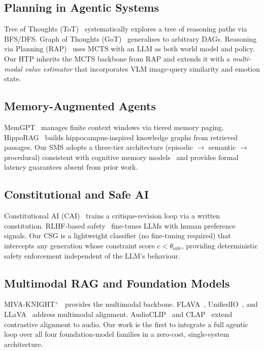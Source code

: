 \documentclass[10pt,conference]{IEEEtran}
\theoremstyle{ieeethm}
\theoremstyle{ieeedef}
\theoremstyle{ieeeremark}
\begin{document}
\subsection{Planning in Agentic Systems}

Tree of Thoughts (ToT)~\cite{yao2023tot} systematically explores a tree of reasoning paths via BFS/DFS. Graph of Thoughts (GoT)~\cite{besta2023got} generalises to arbitrary DAGs. Reasoning via Planning (RAP)~\cite{hao2023rap} uses MCTS with an LLM as both world model and policy. Our HTP inherits the MCTS backbone from RAP and extends it with a \emph{multi-modal value estimator} that incorporates VLM image-query similarity and emotion state.

\subsection{Memory-Augmented Agents}

MemGPT~\cite{packer2023memgpt} manages finite context windows via tiered memory paging. HippoRAG~\cite{gutierrez2024hipporag} builds hippocampus-inspired knowledge graphs from retrieved passages. Our SMS adopts a three-tier architecture (episodic $\to$ semantic $\to$ procedural) consistent with cognitive memory models~\cite{atkinson1968human} and provides formal latency guarantees absent from prior work.

\subsection{Constitutional and Safe AI}

Constitutional AI (CAI)~\cite{bai2022constitutional} trains a critique-revision loop via a written constitution. RLHF-based safety~\cite{ouyang2022training} fine-tunes LLMs with human preference signals. Our CSG is a lightweight classifier (no fine-tuning required) that intercepts any generation whose constraint score $c < \theta_\text{safe}$, providing deterministic safety enforcement independent of the LLM's behaviour.

\subsection{Multimodal RAG and Foundation Models}

\textsc{MIVA-KNIGHT}$^+$~\cite{soyinka2024mivaplus} provides the multimodal backbone. FLAVA~\cite{singh2022flava}, UnifiedIO~\cite{lu2022unified}, and LLaVA~\cite{liu2023llava} address multimodal alignment. AudioCLIP~\cite{guzhov2022audioclip} and CLAP~\cite{elizalde2023clap} extend contrastive alignment to audio. Our work is the first to integrate a full agentic loop over all four foundation-model families in a zero-cost, single-system architecture.
\end{document}
